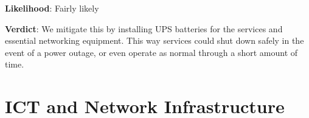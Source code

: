\textbf{Likelihood}: Fairly likely

\textbf{Verdict}: We mitigate this by installing UPS batteries for the services and essential networking equipment. This way services could shut down safely in the event of a power outage, or even operate as normal through a short amount of time.



\section{ICT and Network Infrastructure}

%




